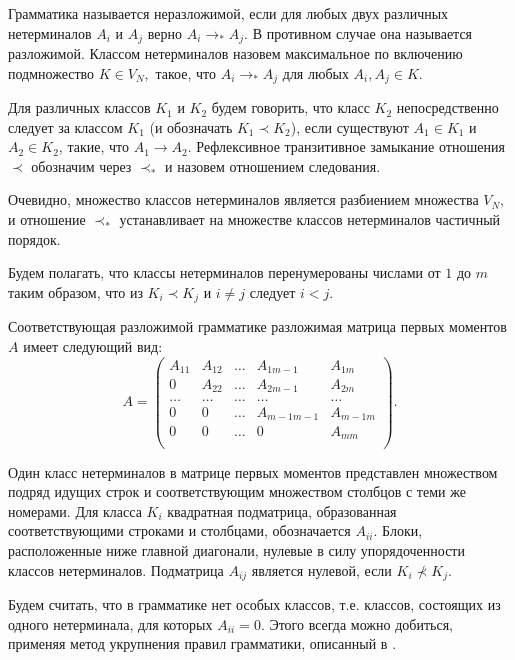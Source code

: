 \documentclass[%
11pt,a4paper]{article}
\begin{document}
{Грамматика называется неразложимой, если для любых двух различных нетерминалов $A_i$ и $A_j$ верно
$A_i \rightarrow_* A_j.$ В противном случае она называется разложимой. Классом нетерминалов назовем максимальное по включению подмножество $K \in V_N,$ такое, что $A_i \rightarrow_* A_j$ для любых $A_i, A_j \in K.$

Для различных классов $K_1$ и $K_2$ будем говорить, что класс $K_2$ непосредственно следует за классом $K_1$ (и обозначать $K_1 \prec K_2$), если
существуют $A_1 \in K_1$ и $A_2 \in K_2$, такие, что $A_1 \rightarrow A_2.$
Рефлексивное транзитивное замыкание отношения $\prec$ обозначим через $\prec _*$ и назовем отношением следования.

Очевидно, множество классов нетерминалов является разбиением множества $V_N,$ и отношение $\prec_*$ устанавливает на множестве классов нетерминалов частичный порядок.

Будем полагать, что классы нетерминалов перенумерованы числами от $1$ до $m$ таким образом, что из $K_i \prec K_j$ и $i\neq j$ следует $i < j.$

Соответствующая разложимой грамматике разложимая матрица \cite{gant} первых моментов $A$ имеет следующий вид:
\begin{equation}
A=\left(
\begin{array}{ccccc}
A_{11} & A_{12} & \ldots & A_{1 m-1} & A_{1m} \\
0 &    A_{22}   & \ldots & A_{2 m-1} & A_{2m} \\
\ldots & \ldots & \ldots & \ldots& \ldots \\
0 & 0 &  \ldots & A_{m-1 m-1} & A_{m-1 m} \\
0 & 0 &  \ldots & 0 & A_{m m} \\
\end{array}
\right).
\label{1}
\end{equation}

Один класс нетерминалов в матрице первых моментов представлен множеством подряд идущих строк и соответствующим множеством столбцов с теми же номерами.
Для класса $K_i$ квадратная подматрица, образованная соответствующими строками и столбцами, обозначается $A_{ii}$.
Блоки, расположенные ниже главной диагонали, нулевые в силу упорядоченности классов нетерминалов. Подматрица $A_{ij}$ является нулевой, если $K_i \nprec K_j.$

Будем считать, что в грамматике нет особых классов, т.е. классов, состоящих из одного нетерминала, для которых $A_{ii}=0.$ Этого всегда можно добиться, применяя метод укрупнения правил грамматики, 
описанный в \cite{zhil1}.  

}
\end{document}
